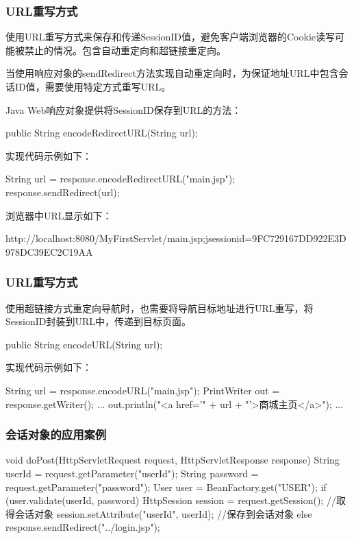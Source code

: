\begin{frame}[fragile] %
\frametitle{URL重写方式} 

使用URL重写方式来保存和传递SessionID值，避免客户端浏览器的Cookie读写可能被禁止的情况。包含{\hei\Red 自动重定向和超链接重定向}。


当使用{\hei\Red 响应对象}的sendRedirect方法实现自动重定向时，为保证地址URL中包含会话ID值，需要使用特定方式重写URL。

Java Web响应对象提供将SessionID保存到URL的方法：

\begin{javaCode}
public String encodeRedirectURL(String url);  
\end{javaCode}

实现代码示例如下：
\begin{javaCode}
String url = response.encodeRedirectURL("main.jsp");
response.sendRedirect(url);
\end{javaCode}

浏览器中URL显示如下：
\begin{shCode}
http://localhost:8080/MyFirstServlet/main.jsp;jsessionid=9FC729167DD922E3D978DC39EC2C19AA  
\end{shCode}
\end{frame}

\begin{frame}[fragile] %
\frametitle{URL重写方式} 

使用超链接方式重定向导航时，也需要将导航目标地址进行URL重写，将SessionID封装到URL中，传递到目标页面。
\begin{javaCode}
public String encodeURL(String url);
\end{javaCode}

实现代码示例如下：
\begin{javaCode}
String url = response.encodeURL("main.jsp");
PrintWriter out = response.getWriter();
...
out.println("<a href='" + url + "'>商城主页</a>");
... 
\end{javaCode}
\end{frame}

\begin{frame}[fragile] %
\frametitle{会话对象的应用案例} 

\begin{javaCode}
void doPost(HttpServletRequest request, HttpServletResponse response) {
  String userId = request.getParameter("userId");
  String password = request.getParameter("password");
  User user = BeanFactory.get("USER");
  if (user.validate(userId, password) {
    HttpSession session = request.getSession();  //取得会话对象
    session.setAttribute("userId", userId);  //保存到会话对象
  } else {
    response.sendRedirect("../login.jsp");
  }
}
\end{javaCode}
\end{frame}

